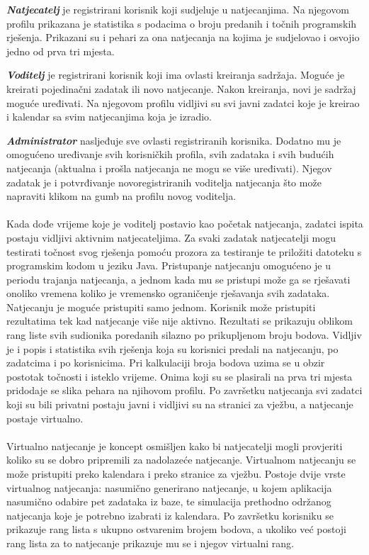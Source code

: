 		
	    \textbf{\textit{Natjecatelj}} je registrirani korisnik koji sudjeluje u natjecanjima. Na njegovom profilu prikazana je statistika s podacima o broju predanih i točnih programskih rješenja. Prikazani su i pehari za ona natjecanja na kojima je sudjelovao i osvojio jedno od prva tri mjesta.
	    
	    \textbf{\textit{Voditelj}} je registrirani korisnik koji ima ovlasti kreiranja sadržaja. Moguće je kreirati pojedinačni zadatak ili novo natjecanje. 
	    Nakon kreiranja, novi je sadržaj moguće uređivati.
	    Na njegovom profilu vidljivi su svi javni zadatci koje je kreirao i kalendar sa svim natjecanjima koja je izradio.
	    
	    \textbf{\textit{Administrator}} nasljeđuje sve ovlasti registriranih korisnika. Dodatno mu je omogućeno uređivanje svih korisničkih profila, svih zadataka i svih budućih natjecanja (aktualna i prošla natjecanja ne mogu se više uređivati). Njegov zadatak je i potvrđivanje novoregistriranih voditelja natjecanja što može napraviti klikom na gumb na profilu novog voditelja. \\
	
		\\
		Kada dođe vrijeme koje je voditelj postavio kao početak natjecanja, zadatci ispita postaju vidljivi aktivnim natjecateljima. Za svaki zadatak natjecatelji mogu testirati točnost svog rješenja pomoću prozora za testiranje te priložiti datoteku s programskim kodom u jeziku Java. Pristupanje natjecanju omogućeno je u periodu trajanja natjecanja, a jednom kada mu se pristupi može ga se rješavati onoliko vremena koliko je vremensko ograničenje rješavanja svih zadataka. Natjecanju je moguće pristupiti samo jednom. Korisnik može pristupiti rezultatima tek kad natjecanje više nije aktivno. Rezultati se prikazuju oblikom rang liste svih sudionika poredanih silazno po prikupljenom broju bodova. Vidljiv je i popis i statistika svih rješenja koja su korisnici predali na natjecanju, po zadatcima i po korisnicima. Pri kalkulaciji broja bodova uzima se u obzir postotak točnosti i isteklo vrijeme. Onima koji su se plasirali na prva tri mjesta pridodaje se slika pehara na njihovom profilu. Po završetku natjecanja svi zadatci koji su bili privatni postaju javni i vidljivi su na stranici za vježbu, a natjecanje postaje virtualno.\\
		
		
		\\
		Virtualno natjecanje je koncept osmišljen kako bi natjecatelji mogli provjeriti koliko su se dobro pripremili za nadolazeće natjecanje. Virtualnom natjecanju se može pristupiti preko kalendara i preko stranice za vježbu. Postoje dvije vrste virtualnog natjecanja: nasumično generirano natjecanje, u kojem aplikacija nasumično odabire pet zadataka iz baze, te simulacija prethodno održanog natjecanja koje je potrebno izabrati iz kalendara. Po završetku korisniku se prikazuje rang lista s ukupno ostvarenim brojem bodova, a ukoliko već postoji rang lista za to natjecanje prikazuje mu se i njegov virtualni rang.  \\
		
